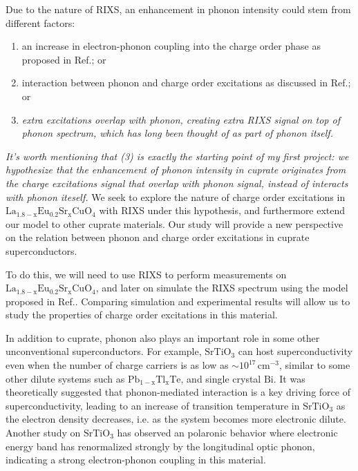 \documentclass[11pt]{article}
\begin{document}
Due to the nature of RIXS, an enhancement in phonon intensity could stem from different factors: 
\begin{enumerate}
  \item an increase in electron-phonon coupling into the charge order phase as proposed in Ref.\cite{wang_charge_2021,peng_electronic_2022}; or
  \item interaction between phonon and charge order excitations as discussed in Ref.\cite{li_multiorbital_2020, chaix_dispersive_2017,huang_quantum_2021}; or 
  \item \textit{extra excitations overlap with phonon, creating extra RIXS signal on top of phonon spectrum, which has long been thought of as part of phonon itself.} 
\end{enumerate}
\textit{It's worth mentioning that (3) is exactly the starting point of my first project: we hypothesize that the enhancement of phonon intensity in cuprate originates from the charge excitations signal that overlap with phonon signal, instead of interacts with phonon iteself.}  We seek to explore the nature of charge order excitations in $\mathrm{La_{1.8-x}Eu_{0.2}Sr_xCuO_{4}}$ with RIXS under this hypothesis, and furthermore extend our model to other cuprate materials. Our study will provide a new perspective on the relation between phonon and charge order excitations in cuprate superconductors. 

To do this, we will need to use RIXS to perform measurements on $\mathrm{La_{1.8-x}Eu_{0.2}Sr_xCuO_{4}}$, and later on simulate the RIXS spectrum using the model proposed in Ref.\cite{devereaux_directly_2016}. Comparing simulation and experimental results will allow us to study the properties of charge order excitations in this material. 

In addition to cuprate, phonon also plays an important role in some other unconventional superconductors. For example, $\mathrm{SrTiO_{3}}$ can host superconductivity even when the number of charge carriers is as low as $\sim 10^{17}\,\mathrm{cm^{-3}}$\cite{schooley_superconductivity_1964,lin_fermi_2013}, similar to some other dilute systems such as $\mathrm{Pb_{1-x}Tl_{x}Te}$\cite{}, and single crystal $\mathrm{Bi}$\cite{}. It was theoretically suggested that phonon-mediated interaction is a key driving force of superconductivity, leading to an increase of transition temperature in $\mathrm{SrTiO_{3}}$ as the electron density decreases\cite{gastiasoro_phonon-mediated_2019}, i.e. as the system becomes more electronic dilute. Another study on $\mathrm{SrTiO_{3}}$ has observed an polaronic behavior where electronic energy band has renormalized strongly by the longitudinal optic phonon, indicating a strong electron-phonon coupling in this material\cite{swartz_polaronic_2018}. 
\end{document}
